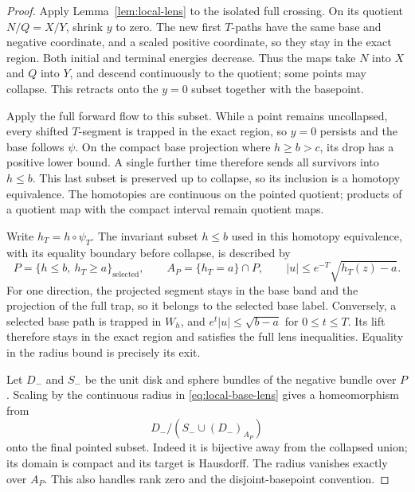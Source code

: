 \begin{proof}
Apply Lemma~\ref{lem:local-lens} to the isolated full
crossing.  On its quotient \(N/Q=X/Y\), shrink \(y\)
to zero.  The new first \(T\)-paths have the same base
and negative coordinate, and a scaled positive coordinate,
so they stay in the exact region.  Both initial and terminal
energies decrease.  Thus the maps take \(N\) into \(X\)
and \(Q\) into \(Y\), and descend continuously to the
quotient; some points may collapse.  This retracts onto
the \(y=0\) subset together with the basepoint.

Apply the full forward flow to this subset.  While a
point remains uncollapsed, every shifted \(T\)-segment
is trapped in the exact region, so \(y=0\) persists and
the base follows \(\psi\).  On the compact base projection
where \(h\ge b>c\), its drop has a positive lower bound.
A single further time therefore sends all survivors
into \(h\le b\).  This last subset is preserved up to
collapse, so its inclusion is a homotopy equivalence.
The homotopies are continuous on the pointed quotient;
products of a quotient map with the compact interval
remain quotient maps.

Write \(h_T=h\circ\psi_T\).  The invariant subset \(h\le b\)
used in this homotopy equivalence, with its equality boundary before collapse,
is described by
\begin{equation}\label{eq:local-base-lens}
 P=\{h\le b,\ h_T\ge a\}_{\mathrm{selected}},\qquad
 A_P=\{h_T=a\}\cap P,\qquad
 |u|\le e^{-T}\sqrt{h_T(z)-a}.
\end{equation}
For one direction, the projected segment stays in the
base band and the projection of the full trap, so it
belongs to the selected base label.  Conversely, a
selected base path is trapped in \(W_h\), and
\(e^t|u|\le\sqrt{b-a}\) for \(0\le t\le T\).
Its lift therefore stays in the exact region and
satisfies the full lens inequalities.  Equality in
the radius bound is precisely its exit.

Let \(D_-\) and \(S_-\) be the unit disk and sphere
bundles of the negative bundle over \(P\).  Scaling by
the continuous radius in \eqref{eq:local-base-lens}
gives a homeomorphism from
\begin{equation}\label{eq:local-thom-quotient}
 D_-/(S_-\cup(D_-)_{A_P})
\end{equation}
onto the final pointed subset.  Indeed it is bijective
away from the collapsed union; its domain is compact
and its target is Hausdorff.  The radius vanishes
exactly over \(A_P\).  This also handles rank zero
and the disjoint-basepoint convention.


\end{proof}
